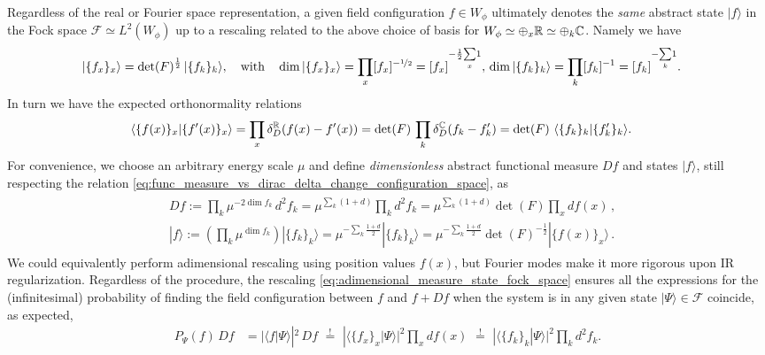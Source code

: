 \documentclass[../QFT_main.tex]{subfiles}
\begin{document}
\begin{mytheorem}
Regardless of the real or Fourier space representation, a given field configuration {\small $f\in W_\phi$} ultimately denotes the \emph{same} abstract state {\small$|f\rangle$} in the Fock space {\small $\mathcal{F}\simeq L^2(W_{\phi})$} up to a rescaling related to the above choice of basis for $W_{\phi}\simeq \oplus_x \mathbb{R} \simeq \oplus_k \mathbb{C}$.
Namely we have
{\small
\begin{align}
    |\{f_x\}_x \rangle &= \det(F)^{\frac{1}{2}}\, |\{f_k\}_k \rangle,\quad \text{with}\quad
    \dim|\{f_x\}_x \rangle= \prod_x [f_x]^{-\nicefrac{1}{2}} = [f_x]^{-\frac{1}{2}\underset{x}{\sum}1},\, \dim|\{f_k\}_k \rangle= \prod_k [f_k]^{-1} = [f_k]^{-\underset{k}{\sum}1}.
\end{align}
}
In turn we have the expected orthonormality relations
\begin{align}
    \langle \{f(x)\}_x | \{f'(x)\}_x \rangle &= \prod_x \delta_D^{\mathbb{R}}(f(x) - f'(x)) = \det(F)\, \prod_k \delta_D^{\mathbb{C}}(f_k - f'_k) = \det(F)\,\,\langle \{f_k\}_k | \{f'_k\}_k \rangle.
\end{align}
For convenience, we choose an arbitrary energy scale $\mu$ and define \emph{dimensionless} abstract functional measure $Df$ and states $|f\rangle$, still respecting the relation \eqref{eq:func_measure_vs_dirac_delta_change_configuration_space}, as
\begin{align}\label{eq:adimensional_measure_state_fock_space}
\begin{aligned}
    &Df :=  \prod_k \mu^{-2\dim f_k} \,d^2\!f_k =  \mu^{\sum_k (1+d)} \prod_k d^2\!f_k = \mu^{\underset{k}{\sum}(1+d)} \det(F) \prod_x df(x)\,,
    \\[3pt]
    &|f\rangle := \left(\prod_k \mu^{\dim f_k}\right) |\{f_k\}_k \rangle = \mu^{-\underset{k}{\sum}\frac{1+d}{2}} |\{f_k\}_k \rangle
    = \mu^{-\underset{k}{\sum}\frac{1+d}{2}} \det(F)^{-\frac{1}{2}} |\{f(x)\}_x \rangle\,.
\end{aligned}
\end{align}
We could equivalently perform adimensional rescaling using position values $f(x)$, but Fourier modes make it more rigorous upon IR regularization.
Regardless of the procedure, the rescaling \eqref{eq:adimensional_measure_state_fock_space} ensures all the expressions for the (infinitesimal) probability of finding the field configuration between $f$ and $f+Df$ when the system is in any given state $|\Psi\rangle \in \mathcal{F}$ coincide, as expected,
\begin{align}\label{eq:infinitesimal_probability_field_config_coincide}
    P_{\Psi}(f) \,Df &= |\langle f | \Psi \rangle|^2 \,Df \,\,\overset{!}{=} \,\,|\langle \{f_x\}_x | \Psi \rangle|^2 \prod_x df(x)\,\, \overset{!}{=}\,\, |\langle \{f_k\}_k | \Psi \rangle|^2 \prod_k d^2\!f_k.

\end{align}
\end{mytheorem}
\end{document}
